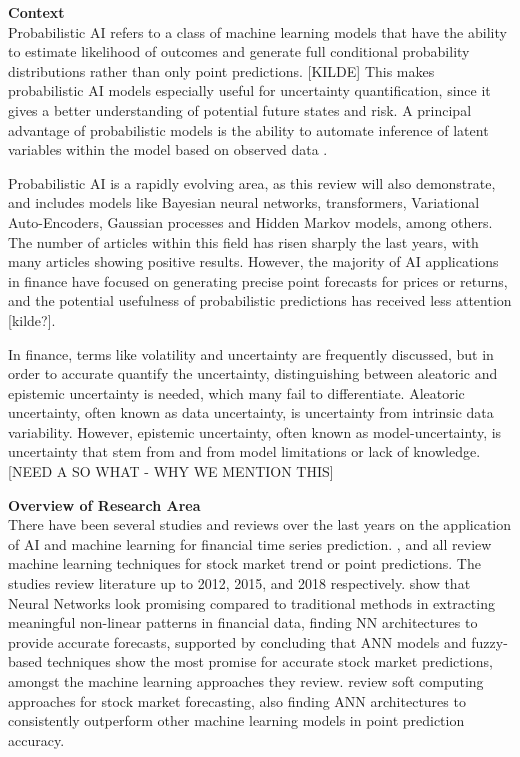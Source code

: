 \textbf{Context}\\
Probabilistic AI refers to a class of machine learning models that have the ability to estimate likelihood of outcomes and generate full conditional probability distributions rather than only point predictions. [KILDE] This makes probabilistic AI models especially useful for uncertainty quantification, since it gives a better understanding of potential future states and risk. A principal advantage of probabilistic models is the ability to automate inference of latent variables within the model based on observed data \parencite{Ghahramani2015}.

Probabilistic AI is a rapidly evolving area, as this review will also demonstrate, and includes models like Bayesian neural networks, transformers, Variational Auto-Encoders, Gaussian processes and Hidden Markov models, among others. The number of articles within this field has risen sharply the last years, with many articles showing positive results. However, the majority of AI applications in finance have focused on generating precise point forecasts for prices or returns, and the potential usefulness of probabilistic predictions has received less attention [kilde?].

In finance, terms like volatility and uncertainty are frequently discussed, but in order to accurate quantify the uncertainty, distinguishing between aleatoric and epistemic uncertainty is needed, which many fail to differentiate. Aleatoric uncertainty, often known as data uncertainty, is uncertainty from intrinsic data variability. However, epistemic uncertainty, often known as model-uncertainty, is uncertainty that stem from and from model limitations or lack of knowledge. \parencite[7,34]{pml1Book, KIUREGHIAN2009105, hullermeier2021aleatoric} [NEED A SO WHAT - WHY WE MENTION THIS]

\textbf{Overview of Research Area}\\
There have been several studies and reviews over the last years on the application of AI and machine learning for financial time series prediction. \textcite{preethi2012stock}, \textcite{soni2015cloud} and \textcite{gandhmalstockmarket2019} all review machine learning techniques for stock market trend or point predictions. The studies review literature up to 2012, 2015, and 2018 respectively. \textcite{soni2015cloud} show that Neural Networks look promising compared to traditional methods in extracting meaningful non-linear patterns in financial data, finding NN architectures to provide accurate forecasts, supported by \textcite{gandhmalstockmarket2019} concluding that ANN models and fuzzy-based techniques show the most promise for accurate stock market predictions, amongst the machine learning approaches they review. \textcite{shi2019soft} review soft computing approaches for stock market forecasting, also finding ANN architectures to consistently outperform other machine learning models in point prediction accuracy. 

